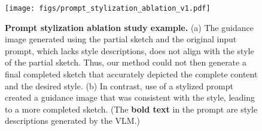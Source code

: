 \begin{figure}[!t]
  \centering
  \texttt{[image: figs/prompt\_stylization\_ablation\_v1.pdf]}
  \caption{
\textbf{Prompt stylization ablation study example.} 
(a) The guidance image generated using the partial sketch and the original input prompt, which lacks style descriptions, does not align with the style of the partial sketch. 
Thus, our method could not then generate a final completed sketch that accurately depicted the complete content and the desired style.
(b) In contrast, use of a stylized prompt created a guidance image that was consistent with the style, leading to a more completed sketch.
(The \textbf{bold text} in the prompt are style descriptions generated by the VLM.)
}
\label{fig:prompt_stylization_ablation}
\end{figure}
